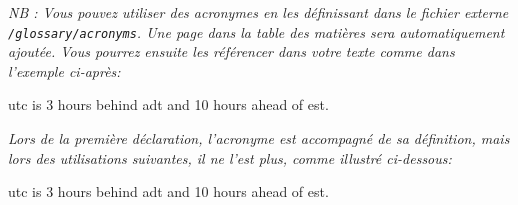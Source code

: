 \printnoidxglossary[type=\acronymtype,title={Liste de acronymes}]

\vspace{5cm}
\textit{NB : Vous pouvez utiliser des acronymes en les définissant dans le fichier externe \texttt{/glossary/acronyms}. Une page dans la table des matières sera automatiquement ajoutée. Vous pourrez ensuite les référencer dans votre texte comme dans l'exemple ci-après:}\medskip

\gls{utc} is 3 hours behind \gls{adt} and 10 hours ahead of \gls{est}.\medskip

\textit{Lors de la première déclaration, l'acronyme est accompagné de sa définition, mais lors des utilisations suivantes, il ne l'est plus, comme illustré ci-dessous:}\medskip

\gls{utc} is 3 hours behind \gls{adt} and 10 hours ahead of \gls{est}.